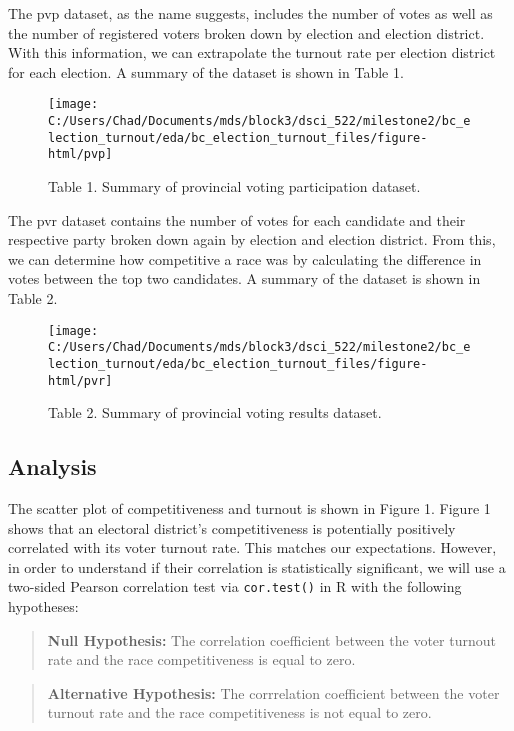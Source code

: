 \documentclass[
]{article}
\begin{document}
The pvp dataset, as the name suggests, includes the number of votes as
well as the number of registered voters broken down by election and
election district. With this information, we can extrapolate the turnout
rate per election district for each election. A summary of the dataset
is shown in Table 1.

\begin{figure}
\texttt{[image: C:/Users/Chad/Documents/mds/block3/dsci\_522/milestone2/bc\_election\_turnout/eda/bc\_election\_turnout\_files/figure-html/pvp]} \caption{Table 1. Summary of provincial voting participation dataset.}\label{fig:tab_1}
\end{figure}

The pvr dataset contains the number of votes for each candidate and
their respective party broken down again by election and election
district. From this, we can determine how competitive a race was by
calculating the difference in votes between the top two candidates. A
summary of the dataset is shown in Table 2.

\begin{figure}
\texttt{[image: C:/Users/Chad/Documents/mds/block3/dsci\_522/milestone2/bc\_election\_turnout/eda/bc\_election\_turnout\_files/figure-html/pvr]} \caption{Table 2. Summary of provincial voting results dataset.}\label{fig:unnamed-chunk-1}
\end{figure}

\hypertarget{analysis}{%
\subsection{Analysis}\label{analysis}}

The scatter plot of competitiveness and turnout is shown in Figure 1.
Figure 1 shows that an electoral district's competitiveness is
potentially positively correlated with its voter turnout rate. This
matches our expectations. However, in order to understand if their
correlation is statistically significant, we will use a two-sided
Pearson correlation test via \texttt{cor.test()} in R with the following
hypotheses:

\begin{quote}
\textbf{Null Hypothesis:} The correlation coefficient between the voter
turnout rate and the race competitiveness is equal to zero.
\end{quote}

\begin{quote}
\textbf{Alternative Hypothesis:} The corrrelation coefficient between
the voter turnout rate and the race competitiveness is not equal to
zero.
\end{quote}
\end{document}
